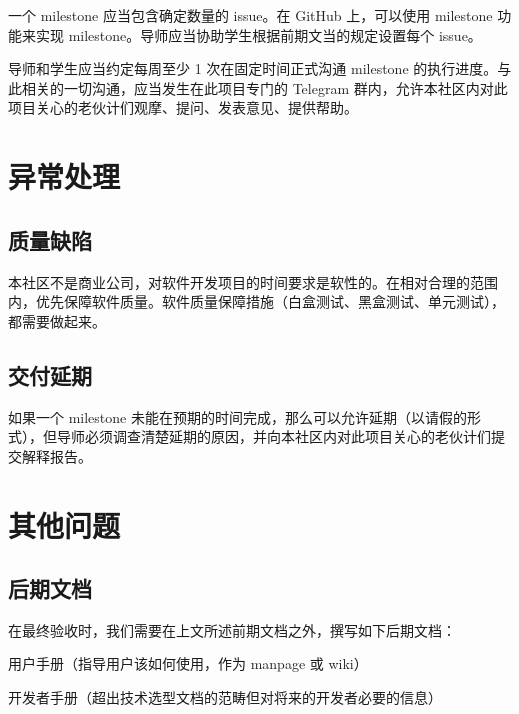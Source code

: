 \documentclass[a4paper,11pt]{article}
\newcommand{\smallnote}[1]{{\sffamily\footnotesize#1}}
\begin{document}
一个 milestone 应当包含确定数量的 issue。在 GitHub 上，可以使用 milestone 功能来实现 milestone。导师应当协助学生根据前期文当的规定设置每个 issue。

导师和学生应当约定每周至少 1 次在固定时间正式沟通 milestone 的执行进度。与此相关的一切沟通，应当发生在此项目专门的 Telegram 群内，允许本社区内对此项目关心的老伙计们观摩、提问、发表意见、提供帮助。











\section{异常处理}

\subsection{质量缺陷}

本社区不是商业公司，对软件开发项目的时间要求是软性的。在相对合理的范围内，优先保障软件质量。软件质量保障措施（白盒测试、黑盒测试、单元测试），都需要做起来。

\subsection{交付延期}

如果一个 milestone 未能在预期的时间完成，那么可以允许延期（以请假的形式），但导师必须调查清楚延期的原因，并向本社区内对此项目关心的老伙计们提交解释报告。
















\section{其他问题}

\subsection{后期文档}

在最终验收时，我们需要在上文所述前期文档之外，撰写如下后期文档：

\begin{compactitem}
	\item 用户手册\smallnote{（指导用户该如何使用，作为 manpage 或 wiki）}
	\item 开发者手册\smallnote{（超出技术选型文档的范畴但对将来的开发者必要的信息）}
\end{compactitem}
\end{document}
